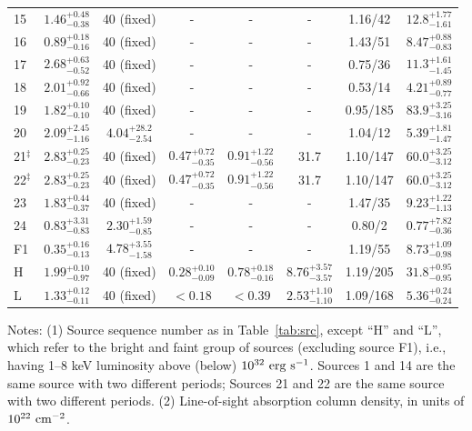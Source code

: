 \documentclass[fleqn,usenatbib]{mnras}
\begin{document}
\begin{table}
\begin{threeparttable}
\begin{spacing}{1.19}
\begin{tabular}{lccccccc}
15 & $1.46^{+0.48}_{-0.38}$ & 40 (fixed) &-&-&-&  1.16/42 & $12.8^{+1.77}_{-1.61}$
\\
16 & $0.89^{+0.18}_{-0.16}$ & 40 (fixed) &-&-&-&  1.43/51  & $8.47^{+0.88}_{-0.83}$
\\
17 & $2.68^{+0.63}_{-0.52}$ & 40 (fixed)  &-&-&-&  0.75/36 & $11.3^{+1.61}_{-1.45}$
\\
18 & $2.01^{+0.92}_{-0.66}$ & 40 (fixed)  &-&-&-&  0.53/14  & $4.21^{+0.89}_{-0.77}$
\\
19 & $1.82^{+0.10}_{-0.10}$ & 40 (fixed)  &-&-&-& 0.95/185  & $83.9^{+3.25}_{-3.16}$
\\
20 & $2.09^{+2.45}_{-1.16}$ & $4.04^{+28.2}_{-2.54}$ &-&-&-& 1.04/12  & $5.39^{+1.81}_{-1.47}$
\\
21$^\ddag$ & $2.83^{+0.25}_{-0.23}$ & 40 (fixed)  & $0.47^{+0.72}_{-0.35}$ & $0.91^{+1.22}_{-0.56}$ & 31.7 & 1.10/147  & $60.0^{+3.25}_{-3.12}$
\\
22$^\ddag$ & $2.83^{+0.25}_{-0.23}$ & 40 (fixed)  & $0.47^{+0.72}_{-0.35}$ & $0.91^{+1.22}_{-0.56}$ &  31.7 & 1.10/147  & $60.0^{+3.25}_{-3.12}$
\\
23 & $1.83^{+0.44}_{-0.37}$ & 40 (fixed)  & - &-& - & 1.47/35  & $9.23^{+1.22}_{-1.13}$
\\
24 & $0.83^{+3.31}_{-0.83}$ & $2.30^{+1.59}_{-0.85}$ &-&-&-&  0.80/2 & $0.77^{+7.82}_{-0.36}$ 
\\
\hline
F1 & $0.35^{+0.16}_{-0.13}$ & $4.78^{+3.55}_{-1.58}$ &-&-&-& 1.19/55  & $8.73^{+1.09}_{-0.98}$ \\
\hline
H & $1.99^{+0.10}_{-0.97}$ & 40 (fixed)  &  $0.28^{+0.10}_{-0.09}$ & $0.78^{+0.18}_{-0.16}$  & $8.76^{+3.57}_{-3.57}$ & 1.19/205 & $31.8^{+0.95}_{-0.95}	$
\\
L & $1.33^{+0.12}_{-0.11}$ & 40 (fixed)  & $<0.18$  & $<0.39$ & $2.53^{+1.10}_{-1.10}$ & 1.09/168 & $5.36^{+0.24}_{-0.24}$ \\
\hline
\end{tabular}
\end{spacing}
\begin{tablenotes}
      \small
      \item
      Notes: 
      (1) Source sequence number as in Table~\ref{tab:src}, except ``H'' and ``L'', which refer to the bright and faint group of sources (excluding source F1), i.e., having 1--8 keV luminosity above (below) $10^{32}\rm~erg~s^{-1}$. {\dag}Sources 1 and 14 are the same source with two different periods; {\ddag}Sources 21 and 22 are the same source with two different periods. 
(2) Line-of-sight absorption column density, in units of $10^{22}\rm~cm^{-2}$.

\end{tablenotes}
\end{threeparttable}
\end{table}
\end{document}
